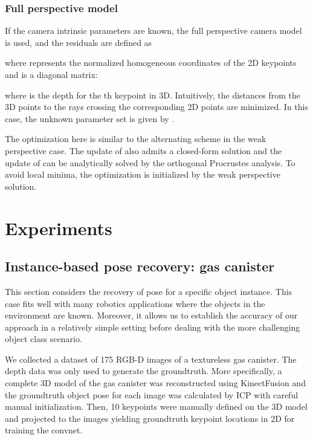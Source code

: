 \documentclass[letterpaper, 10 pt, conference]{ieeeconf}
\begin{document}
\subsubsection{Full perspective model}

If the camera intrinsic parameters are known, the full perspective camera model is used, and the residuals are defined as

where  represents the normalized homogeneous coordinates of the 2D keypoints and  is a diagonal matrix: 

where  is the depth for the th keypoint in 3D. Intuitively, the distances from the 3D points to the rays crossing the corresponding 2D points are minimized. In this case, the unknown parameter set  is given by .

The optimization here is similar to the alternating scheme in the weak perspective case. The update of  also admits a closed-form solution and the update of  can be analytically solved by the orthogonal Procrustes analysis. To avoid local minima, the optimization is initialized by the weak perspective solution.    
\section{Experiments}
\subsection{Instance-based pose recovery: gas canister}

This section considers the recovery of pose for a specific object instance. This case fits well with many robotics applications where the objects in the environment are known. Moreover, it allows us to establish the accuracy of our approach in a relatively simple setting before dealing with the more challenging object class scenario.

We collected a dataset of 175 RGB-D images of a textureless gas canister. 
The depth data was only used to generate the groundtruth. More specifically, a complete 3D model of the gas canister was reconstructed using KinectFusion \cite{newcombe2011} and the groundtruth object pose for each image was calculated by ICP with careful manual initialization. Then, 10 keypoints were manually defined on the 3D model and projected to the images yielding groundtruth keypoint locations in 2D for training the convnet. 
\end{document}
